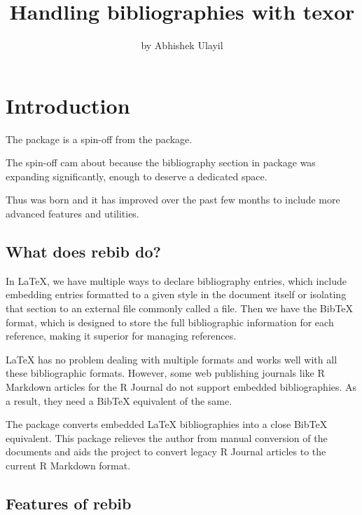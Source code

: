 \title{Handling bibliographies with texor}
\author{by Abhishek Ulayil}

\maketitle


\section{Introduction}
The  package is a spin-off from the  package.

The spin-off cam about because the bibliography section 
in  package was expanding significantly, enough to deserve a dedicated space.

Thus  was born and it has improved over the past few months to include more advanced features and utilities. 

\subsection{What does rebib do?}

In LaTeX, we have multiple ways to declare bibliography entries, which include embedding entries formatted to a given style in the document itself or isolating that section to an external file commonly called a  file. Then we have the BibTeX format, which is designed to store the full bibliographic information for each reference, making it superior for managing references.

LaTeX has no problem dealing with multiple formats and works well with all these bibliographic formats. However, some web publishing journals like R Markdown articles for the R Journal do not support embedded bibliographies. As a result, they need a BibTeX equivalent of the same.

The  package converts embedded LaTeX bibliographies into a close  BibTeX equivalent. This package relieves the author from manual conversion of the documents and aids the project to convert legacy R Journal articles to the current R Markdown format.

\subsection{Features of rebib}

